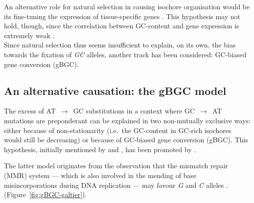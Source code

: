 An alternative role for natural selection in causing isochore organisation would be its fine-tuning the expression of tissue-specific genes \citep{vinogradov2003isochores,vinogradov2005noncoding}.
This hypothesis may not hold, though, since the correlation between GC-content and gene expression is extremely weak \citep[reviewed in \citealp{duret2009biased}]{semon2005relationship,semon2006no,pouyet2017recombination}.\\


Since natural selection thus seems insufficient to explain, on its own, the bias towards the fixation of \textit{GC} alleles, another track has been considered: GC-biased gene conversion (gBGC).





\subsection{An alternative causation: the gBGC model}

The excess of AT~$\rightarrow$~GC substitutions in a context where GC~$\rightarrow$~AT mutations are preponderant can be explained in two non-mutually exclusive ways: either because of non-stationarity (i.e.\ the GC-content in GC-rich isochores would still be decreasing) or because of GC-biased gene conversion (gBGC).
This hypothesis, initially mentioned by \citet{holmquist1992chromosome} and \citet{eyre-walker1993recombination,eyre-walker1999evidence}, has been promoted by \citet{galtier2001gccontent}.

The latter model originates from the observation that the mismatch repair (MMR) system —  \citep[reviewed in \citealp{evans2000roles} and \citealp{spies2015mismatch}]{alani1994interaction,nicolas1994polarity} which is also involved in the mending of base misincorporations during DNA replication \citep{surtees2004mismatch} — may favour \textit{G} and \textit{C} alleles \citep{brown1988different,bill1998efficient}. (Figure~\ref{fig:gBGC-galtier}). \\


